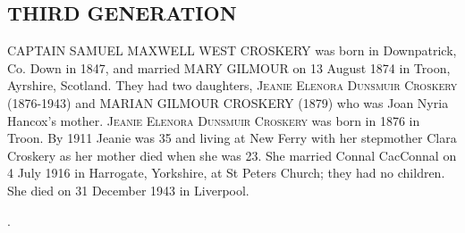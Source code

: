 \subsection{THIRD GENERATION}

 \uppercase{Captain Samuel Maxwell West Croskery} was born in Downpatrick, Co. Down in 1847, and married \uppercase{Mary Gilmour} on 13 August 1874 in Troon, Ayrshire, Scotland. They had two daughters, \textsc{Jeanie Elenora Dunsmuir Croskery} (1876-1943) and \uppercase{Marian Gilmour Croskery} (1879) who was Joan Nyria Hancox's mother.
\textsc{Jeanie Elenora Dunsmuir Croskery} was born in 1876 in Troon. By 1911 Jeanie was 35 and living at New Ferry with her stepmother Clara Croskery as her mother died when she was 23. She married Connal CacConnal on 4 July 1916 in Harrogate, Yorkshire, at St Peters Church; they had no children. She died on 31 December 1943 in Liverpool.

.
